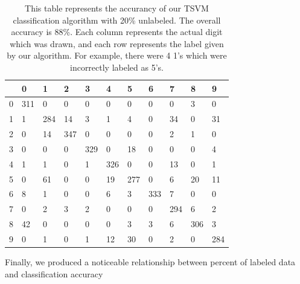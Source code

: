 \documentclass[11pt]{article}
\begin{document}
\begin{table}[]
  \centering
  \caption{This table represents the accurancy of our TSVM classification algorithm with 20\% unlabeled. The overall accuracy is 88\%. Each column represents the actual digit which was drawn, and each row represents the label given by our algorithm. For example, there were 4 1's which were incorrectly labeled as 5's.}
  \label{my-table}
  \vspace{.3in}
  \begin{tabular}{l|llllllllll}
    & 0 & 1 & 2 & 3 & 4 & 5 & 6 & 7 & 8 & 9\\\hline
    0 &311 & 0   & 0   & 0   & 0   & 0   & 0   & 0   & 3   & 0   \\
    1 &1   & 284 & 14  & 3   & 1   & 4   & 0   & 34  & 0   & 31  \\
    2 & 0   & 14  & 347 & 0   & 0   & 0   & 0   & 2   & 1   & 0   \\
    3 & 0   & 0   & 0   & 329 & 0   & 18  & 0   & 0   & 0   & 4   \\
    4 & 1   & 1   & 0   & 1   & 326 & 0   & 0   & 13  & 0   & 1   \\
    5 & 0   & 61  & 0   & 0   & 19  & 277 & 0   & 6   & 20  & 11  \\
    6 & 8   & 1   & 0   & 0   & 6   & 3   & 333 & 7   & 0   & 0   \\
    7 & 0   & 2   & 3   & 2   & 0   & 0   & 0   & 294 & 6   & 2   \\
    8 & 42  & 0   & 0   & 0   & 0   & 3   & 3   & 6   & 306 & 3   \\
    9 & 0   & 1   & 0   & 1   & 12  & 30  & 0   & 2   & 0   & 284
  \end{tabular}
  \end{table}

Finally, we produced a noticeable relationship between percent of labeled data and classification accuracy \par
\end{document}
